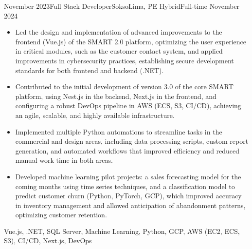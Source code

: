 \begin{experiences}
\experience
  {November 2023}{Full Stack Developer}{Sokso}{Lima, PE}
  {Hybrid}{Full-time}
  {November 2024} {
    \begin{itemize}
      \item Led the design and implementation of advanced improvements to the frontend (Vue.js) of the SMART 2.0 platform, optimizing the user experience in critical modules, such as the customer contact system, and applied improvements in cybersecurity practices, establishing secure development standards for both frontend and backend (.NET).
      \item Contributed to the initial development of version 3.0 of the core SMART platform, using Nest.js in the backend, Next.js in the frontend, and configuring a robust DevOps pipeline in AWS (ECS, S3, CI/CD), achieving an agile, scalable, and highly available infrastructure.
      \item Implemented multiple Python automations to streamline tasks in the commercial and design areas, including data processing scripts, custom report generation, and automated workflows that improved efficiency and reduced manual work time in both areas.
      \item Developed machine learning pilot projects: a sales forecasting model for the coming months using time series techniques, and a classification model to predict customer churn (Python, PyTorch, GCP), which improved accuracy in inventory management and allowed anticipation of abandonment patterns, optimizing customer retention.
    \end{itemize}
  }
  {Vue.js, .NET, SQL Server, Machine Learning, Python, GCP, {AWS (EC2, ECS, S3)}, CI/CD, Next.js, DevOps}


\end{experiences}
